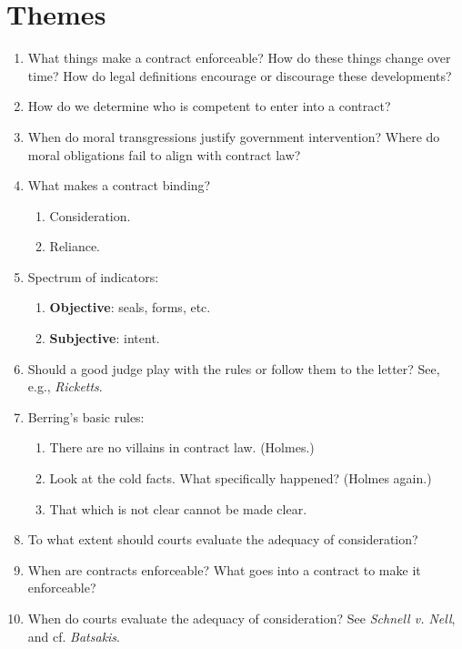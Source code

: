 \section{Themes}

\begin{enumerate}
    \item What things make a contract enforceable? How do these things change 
    over time? How do legal definitions encourage or discourage these 
    developments?
    \item How do we determine who is competent to enter into a contract?
    \item When do moral transgressions justify government intervention? Where 
    do moral obligations fail to align with contract law?
    \item What makes a contract binding?
    \begin{enumerate}
        \item Consideration.
        \item Reliance.
    \end{enumerate}
    \item Spectrum of indicators:
    \begin{enumerate}
        \item \textbf{Objective}: seals, forms, etc.
        \item \textbf{Subjective}: intent.
    \end{enumerate}
    \item Should a good judge play with the rules or follow them to the 
    letter? See, e.g., \emph{Ricketts}.
    \item Berring's basic rules:
    \begin{enumerate}
        \item There are no villains in contract law. (Holmes.)
        \item Look at the cold facts. What specifically happened? (Holmes 
        again.)
        \item That which is not clear cannot be made clear.
    \end{enumerate}
    \item To what extent should courts evaluate the adequacy of consideration?
    \item When are contracts enforceable? What goes into a contract to make it 
    enforceable?
    \item When do courts evaluate the adequacy of consideration? See 
    \emph{Schnell v. Nell}, and cf. \emph{Batsakis}.
\end{enumerate}
